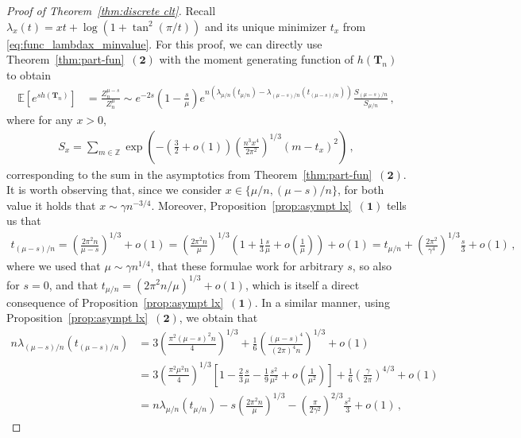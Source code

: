 \documentclass{article}
\newcommand{\E}{\mathbb{E}}								%
\newcommand{\1}{\mathbbm{1}}								%
\theoremstyle{definition}
\numberwithin{equation}{section}
\newcommand{\bT}{\mathbf T}
\newcommand{\Z}{\mathbb Z}
\newcommand{\numitem}[1]{$\mathbf{(#1)}$}
\begin{document}
\begin{proof}[Proof of Theorem~\ref{thm:discrete clt}]
   {Recall $\lambda_x(t)=xt+\log(1+\tan^2(\pi/t))$ and its unique minimizer $t_x$ from \eqref{eq:func_lambdax_minvalue}.} For this proof, we can directly use Theorem~\ref{thm:part-fun}~\numitem{2} with the moment generating function of $h(\bT_n)$ to obtain
    \begin{align*}
        \E\left[e^{sh(\bT_n)}\right]&=\frac{Z_n^{\mu-s}}{Z_n^\mu}\sim e^{-2s}\left(1-\frac{s}{\mu}\right)e^{n(\lambda_{\mu/n}(t_{\mu/n})-\lambda_{(\mu-s)/n}(t_{(\mu-s)/n}))}\frac{S_{(\mu-s)/n}}{S_{\mu/n}}\,,
    \end{align*}
    where {for any $x>0$},
    \begin{align*}
        S_x=\sum_{m\in\Z}\exp\left(-\left(\frac{3}{2}+o(1)\right)\left(\frac{n^3x^4}{2\pi^2}\right)^{1/3}(m-t_x)^2\right)\,,
    \end{align*}
    corresponding to the sum in the asymptotics from Theorem~\ref{thm:part-fun}~\numitem{2}.
    It is worth observing that, since we consider $x\in\{\mu/n,(\mu-s)/n\}$, for both value it holds that $x\sim\gamma n^{-3/4}$.
    Moreover, Proposition~\ref{prop:asympt lx}~\numitem{1} tells us that
    \begin{align*}
        t_{(\mu-s)/n}=\left(\frac{2\pi^2n}{\mu-s}\right)^{1/3}+o(1)=\left(\frac{2\pi^2n}{\mu}\right)^{1/3}\left(1+\frac{1}{3}\frac{s}{\mu}+o\left(\frac{1}{\mu}\right)\right)+o(1)=t_{\mu/n}+\left(\frac{2\pi^2}{\gamma^4}\right)^{1/3}\frac{s}{3}+o(1)\,,
    \end{align*}
    where we used that $\mu\sim\gamma n^{1/4}$, that these formulae work for arbitrary $s$, so also for $s=0$, 
    and that $t_{\mu/n}=(2\pi^2n/\mu)^{1/3}+o(1)$, which is itself a direct consequence of Proposition~\ref{prop:asympt lx}~\numitem{1}.
    In a similar manner, using Proposition~\ref{prop:asympt lx}~\numitem{2}, we obtain that
    \begin{align*}
        n\lambda_{(\mu-s)/n}(t_{(\mu-s)/n})&=3\left(\frac{\pi^2(\mu-s)^2n}{4}\right)^{1/3}+\frac{1}{6}\left(\frac{(\mu-s)^4}{(2\pi)^4n}\right)^{1/3}+o(1)\\
        &=3\left(\frac{\pi^2\mu^2n}{4}\right)^{1/3}\left[1-\frac{2}{3}\frac{s}{\mu}-\frac{1}{9}\frac{s^2}{\mu^2}+o\left(\frac{1}{\mu^2}\right)\right]+\frac{1}{6}\left(\frac{\gamma}{2\pi}\right)^{4/3}+o(1)\\
        &=n\lambda_{\mu/n}(t_{\mu/n})-s\left(\frac{2\pi^2n}{\mu}\right)^{1/3}-\left(\frac{\pi}{2\gamma^2}\right)^{2/3}\frac{s^2}{3}+o(1)\,,
    \end{align*}

\end{proof}
\end{document}
